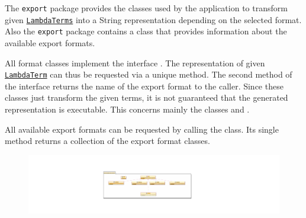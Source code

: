 The \texttt{export} package provides the classes used by the application to transform given \texttt{\hyperref[type:edu.kit.wavelength.client.model.term.LambdaTerm]{LambdaTerms}} into a String representation depending on the selected format. Also the \texttt{export} package contains a \texttt{} class that provides information about the available export formats. 

All format classes implement the interface \texttt{}. The representation of given \texttt{\hyperref[type:edu.kit.wavelength.client.model.term.LambdaTerm]{LambdaTerm}} can thus be requested via a unique method. 
The second method of the interface returns the name of the export format to the caller.
Since these classes just transform the given terms, it is not guaranteed that the generated representation is executable. This concerns mainly the classes \texttt{} and \texttt{}.

All available export formats can be requested by calling the \texttt{} class. Its single method returns a collection of the export format classes.  

\begin{figure}[h]
	\centering
	\includegraphics[width=\textwidth]{packageDiagrams/export}
\end{figure}
